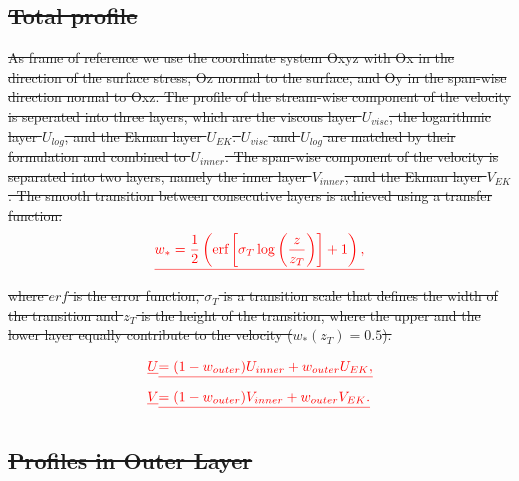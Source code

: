 \documentclass[a4paper,11pt]{article}
\providecommand{\DIFdel}[1]{{\protect\color{red}\sout{#1}}}                      %
\providecommand{\DIFdelbegin}{} %
\providecommand{\DIFdelend}{} %
\begin{document}
\DIFdelbegin \subsection{\DIFdel{Total profile}}
\addtocounter{subsection}{-1}%

\DIFdel{As frame of reference we use the coordinate system Oxyz with Ox in the direction of the surface stress, Oz normal to the surface, and Oy in the span-wise direction normal to Oxz. The profile of the stream-wise component of the velocity is seperated into three layers, which are the viscous layer $U_{visc}$, the logarithmic layer $U_{log}$, and the Ekman layer $U_{EK}$. $U_{visc}$ and $U_{log}$ are matched by their formulation and combined to $U_{inner}$. The span-wise component of the velocity is separated into two layers, namely the inner layer $V_{inner}$, and the Ekman layer $V_{EK}$. The smooth transition between consecutive layers is achieved using a transfer function:
}\begin{align*}\DIFdel{%
  w_{*} = \frac{1}{2}\left(\textrm{erf}\left[\sigma_T\log\left(\frac{z}{z_{T}}\right)\right]+1\right),
}\end{align*}%
\DIFdel{where $erf$ is the error function, $\sigma_T$ is a transition scale that defines the width of the transition and $z_{T}$ is the height of the transition, where the upper and the lower layer equally contribute to the velocity ($w_{*}(z_{T})=0.5$).
}%

\begin{align*}
    \DIFdel{U }&\DIFdel{= (1-w_{outer})U_{inner} + w_{outer}U_{EK},}\\
	  \DIFdel{V }&\DIFdel{= (1-w_{outer})V_{inner} + w_{outer}V_{EK}.
	}\end{align*}%

\subsection{\DIFdel{Profiles in Outer Layer}}
\addtocounter{subsection}{-1}%
\DIFdelend %
\end{document}
